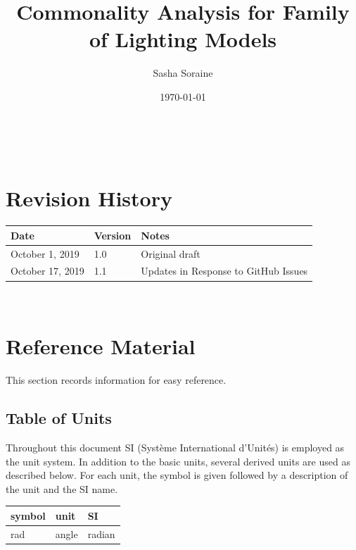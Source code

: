 \documentclass[12pt]{article}
\newcommand{\famname}{Family of Lighting Models} %
\begin{document}
\title{Commonality Analysis for \famname} %
\author{Sasha Soraine}
\date{\today}

\maketitle

~\newpage


\section{Revision History}

\begin{tabularx}{\textwidth}{p{3cm}p{2cm}X}
\toprule {\bf Date} & {\bf Version} & {\bf Notes}\\
\midrule
October 1, 2019 & 1.0 & Original draft\\
October 17, 2019 & 1.1 & Updates in Response to GitHub Issues \\
\bottomrule
\end{tabularx}

~\newpage
	
\section{Reference Material}

This section records information for easy reference.

\subsection{Table of Units}

Throughout this document SI (Syst\`{e}me International d'Unit\'{e}s) is employed
as the unit system.  In addition to the basic units, several derived units are
used as described below.  For each unit, the symbol is given followed by a
description of the unit and the SI name.
~\newline

\renewcommand{\arraystretch}{1.2}
  \noindent \begin{tabular}{l l l} 
    \toprule		
    \textbf{symbol} & \textbf{unit} & \textbf{SI}\\
    \midrule 
    \si{\radian} & angle & radian\\
    \bottomrule
  \end{tabular}
\end{document}
